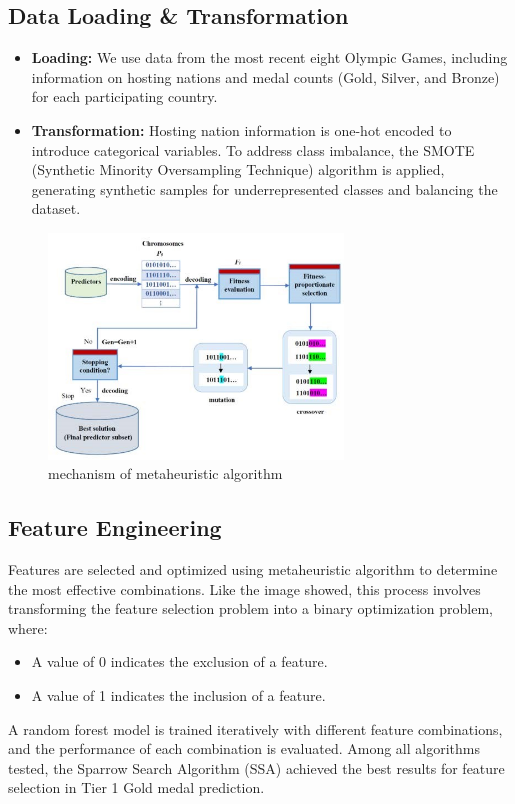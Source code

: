 \documentclass{mcmthesis}
\begin{document}
\subsection{Data Loading \& Transformation}

\begin{itemize}
    \item \textbf{Loading:} We use data from the most recent eight Olympic Games, including information on hosting nations and medal counts (Gold, Silver, and Bronze) for each participating country.
    \item \textbf{Transformation:} Hosting nation information is one-hot encoded to introduce categorical variables. To address class imbalance, the SMOTE (Synthetic Minority Oversampling Technique) algorithm is applied, generating synthetic samples for underrepresented classes and balancing the dataset.
\end{itemize}

\begin{figure}  %
    \centering
    \includegraphics[width=0.9\linewidth,height=6cm]{pics/Multi-Agent_Optimization_Algorithm.jpg}
    \caption{mechanism of metaheuristic algorithm}
    \label{fig:metaheuristic_algorithm}
\end{figure}

\subsection{Feature Engineering}

Features are selected and optimized using metaheuristic algorithm to determine the most effective combinations. Like the image showed, this process involves transforming the feature selection problem into a binary optimization problem, where:
\begin{itemize}
    \item A value of 0 indicates the exclusion of a feature.
    \item A value of 1 indicates the inclusion of a feature.
\end{itemize}
A random forest model is trained iteratively with different feature combinations, and the performance of each combination is evaluated. Among all algorithms tested, the Sparrow Search Algorithm (SSA) achieved the best results for feature selection in Tier 1 Gold medal prediction.
\end{document}
